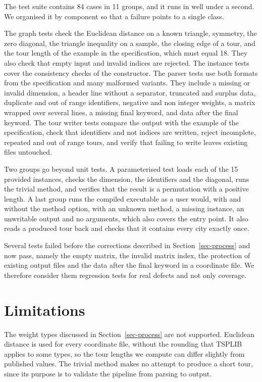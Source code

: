 \documentclass[11pt,a4paper]{article}
\begin{document}
The test suite contains 84 cases in 11 groups, and it runs in well under a second. We organised it by component so that a failure points to a single class.

The graph tests check the Euclidean distance on a known triangle, symmetry, the zero diagonal, the triangle inequality on a sample, the closing edge of a tour, and the tour length of the example in the specification, which must equal 18. They also check that empty input and invalid indices are rejected. The instance tests cover the consistency checks of the constructor. The parser tests use both formats from the specification and many malformed variants. They include a missing or invalid dimension, a header line without a separator, truncated and surplus data, duplicate and out of range identifiers, negative and non integer weights, a matrix wrapped over several lines, a missing final keyword, and data after the final keyword. The tour writer tests compare the output with the example of the specification, check that identifiers and not indices are written, reject incomplete, repeated and out of range tours, and verify that failing to write leaves existing files untouched.

Two groups go beyond unit tests. A parameterised test loads each of the 15 provided instances, checks the dimension, the identifiers and the diagonal, runs the trivial method, and verifies that the result is a permutation with a positive length. A last group runs the compiled executable as a user would, with and without the method option, with an unknown method, a missing instance, an unwritable output and no arguments, which also covers the entry point. It also reads a produced tour back and checks that it contains every city exactly once.

Several tests failed before the corrections described in Section~\ref{sec-process} and now pass, namely the empty matrix, the invalid matrix index, the protection of existing output files and the data after the final keyword in a coordinate file. We therefore consider them regression tests for real defects and not only coverage.

\section{Limitations}

The weight types discussed in Section~\ref{sec-process} are not supported. Euclidean distance is used for every coordinate file, without the rounding that TSPLIB applies to some types, so the tour lengths we compute can differ slightly from published values. The trivial method makes no attempt to produce a short tour, since its purpose is to validate the pipeline from parsing to output.
\end{document}
